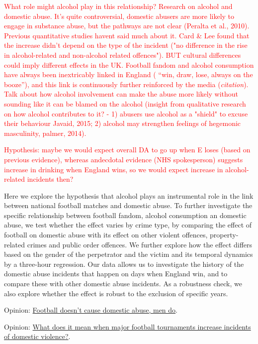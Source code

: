 \documentclass[12pt, letterpaper]{article}
\begin{document}
\textcolor{red}{What role might alcohol play in this relationship? Research on alcohol and domestic abuse. It's quite controversial, domestic abusers are more likely to engage in substance abuse, but the pathways are not clear (Peralta et al., 2010). Previous quantitative studies havent said much about it. Card \& Lee found that the increase didn't depend on the type of the incident ("no difference in the rise in alcohol-related and non-alcohol related offences"). BUT cultural differences could imply different effects in the UK. Football fandom and alcohol consumption have always been inextricably linked in England ( “win, draw, lose, always on the booze”), and this link is continuously further reinforced by the media (\textit{citation}). Talk about how alcohol involvement can make the abuse more likely without sounding like it can be blamed on the alcohol (insight from qualitative research on how alcohol contributes to it? - 1) abusers use alcohol as a "shield" to excuse their behaviour Javaid, 2015; 2) alcohol may strengthen feelings of hegemonic masculinity, palmer, 2014).}

\textcolor{red}{Hypothesis: maybe we would expect overall DA to go up when E loses (based on previous evidence), whereas andecdotal evidence (NHS spokesperson) suggests increase in drinking when England wins, so we would expect increase in alcohol-related incidents then?}

Here we explore the hypothesis that alcohol plays an instrumental role in the link between national football matches and domestic abuse. To further investigate the specific relationship between football fandom, alcohol consumption an domestic abuse, we test whether the effect varies by crime type, by comparing the effect of football on domestic abuse with its effect on other violent offences, property-related crimes and public order offences. We further explore how the effect differs based on the gender of the perpetrator and the victim and its temporal dynamics by a three-hour regression. Our data allows us to investigate the history of the domestic abuse incidents that happen on days when England win, and to compare these with other domestic abuse incidents. As a robustness check, we also explore whether the effect is robust to the exclusion of specific years. 

Opinion: \href{https://www.heraldscotland.com/opinion/14432673.football-doesnt-cause-domestic-abuse-men-do/}{Football doesn't cause domestic abuse, men do}.


Opinion: \href{https://www.newstatesman.com/politics/sport/2016/07/what-does-it-mean-when-major-football-tournaments-increase-incidents-domestic}{What does it mean when major football tournaments increase incidents of domestic violence?}.
\end{document}
